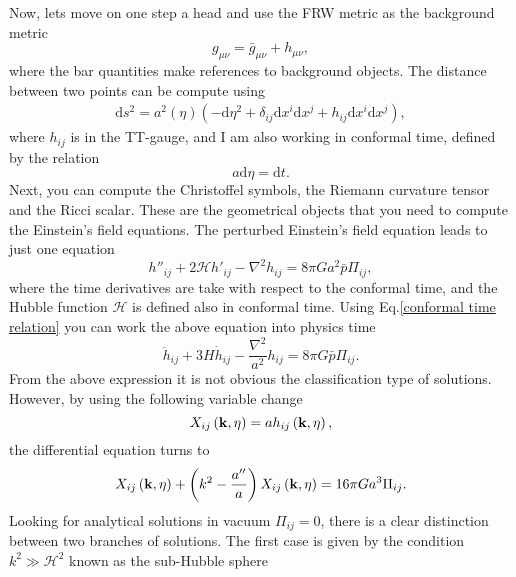 \documentclass{article}
\begin{document}
Now, lets move on one step a head and use the FRW metric as the background metric
\begin{equation}
    g_{\mu\nu} = \bar{g}_{\mu\nu} + h_{\mu\nu},
\end{equation}
where the bar quantities make references to background objects. The distance between two
points can be compute using
\begin{align}
    \mathrm{d}s^{2} = a^{2}(\eta)\left(-\mathrm{d}\eta^2 
    + \delta_{ij}\mathrm{d}x^{i}\mathrm{d}x^{j}
    + h_{ij}\mathrm{d}x^{i}\mathrm{d}x^{j}\right),
\end{align}
where $h_{ij}$ is in the TT-gauge, and I am also working in conformal time, defined 
by the relation 
\begin{equation}
    \label{conformal time relation}
    a\mathrm{d}\eta = \mathrm{d}t.
\end{equation} 
Next, you can compute the Christoffel symbols, the Riemann curvature tensor and the 
Ricci scalar. These are the geometrical objects that you need to compute the Einstein's 
field equations. The perturbed Einstein's field equation leads to just one equation
\begin{equation}
    h''_{ij} + 2\mathcal{H}h'_{ij} - \nabla^{2}h_{ij} = 8\pi G a^{2}\bar{p}\Pi_{ij},
\end{equation}
where the time derivatives are take with respect to the conformal time, and the Hubble function
$\mathcal{H}$ is defined also in conformal time. Using Eq.\eqref{conformal time relation} you can
work the above equation into physics time
\begin{equation}
    \ddot{h}_{ij} + 3H\dot{h}_{ij} - \frac{\nabla^{2}}{a^{2}}h_{ij} = 8\pi G \bar{p}\Pi_{ij}.
\end{equation}
From the above expression it is not obvious the classification type of solutions. However,
by using the following variable change
\begin{equation}
    X_{ij}\left(\bold{k},\eta\right) = a h_{ij}\left(\bold{k},\eta\right),
\end{equation}
the differential equation turns to 
\begin{equation}
    X_{ij}\left(\bold{k},\eta\right) + \left(k^2 - \frac{a''}{a}\right)X_{ij}\left(\bold{k},\eta\right)
    = 16\pi G a^3\Pi_{ij}.
\end{equation}
Looking for analytical solutions in vacuum $\Pi_{ij} = 0$, there is a clear distinction between
two branches of solutions. The first case is given by the condition $k^2 \gg \mathcal{H}^2$ known
as the sub-Hubble sphere
\end{document}
